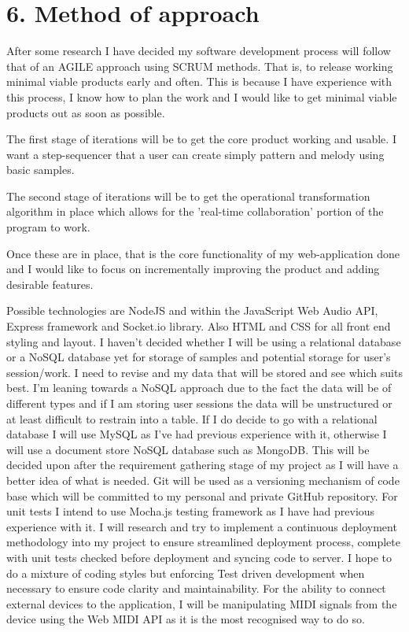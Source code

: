 \documentclass[a4paper]{article}
\begin{document}
\section{6. Method of approach}

After some research I have decided my software development process will follow that of an AGILE approach using SCRUM methods. That is, to release working minimal viable products early and often. This is because I have experience with this process, I know how to plan the work and I would like to get minimal viable products out as soon as possible.

The first stage of iterations will be to get the core product working and usable. I want a step-sequencer that a user can create simply pattern and melody using basic samples.

The second stage of iterations will be to get the operational transformation algorithm in place which allows for the 'real-time collaboration' portion of the program to work.

Once these are in place, that is the core functionality of my web-application done and I would like to focus on incrementally improving the product and adding desirable features.

Possible technologies are NodeJS and within the JavaScript Web Audio API, Express framework and Socket.io library. Also HTML and CSS for all front end styling and layout. I haven't decided whether I will be using a relational database or a NoSQL database yet for storage of samples and potential storage for user's session/work. I need to revise and my data that will be stored and see which suits best. I'm leaning towards a NoSQL approach due to the fact the data will be of different types and if I am storing user sessions the data will be unstructured or at least difficult to restrain into a table. If I do decide to go with a relational database I will use MySQL as I've had previous experience with it, otherwise I will use a document store NoSQL database such as MongoDB. This will be decided upon after the requirement gathering stage of my project as I will have a better idea of what is needed. Git will be used as a versioning mechanism of code base which will be committed to my personal and private GitHub repository. For unit tests I intend to use Mocha.js testing framework as I have had previous experience with it. I will research and try to implement a continuous deployment methodology into my project to ensure streamlined deployment process, complete with unit tests checked before deployment and syncing code to server. I hope to do a mixture of coding styles but enforcing Test driven development when necessary to ensure code clarity and maintainability. For the ability to connect external devices to the application, I will be manipulating MIDI signals from the device using the Web MIDI API as it is the most recognised way to do so.
\end{document}
